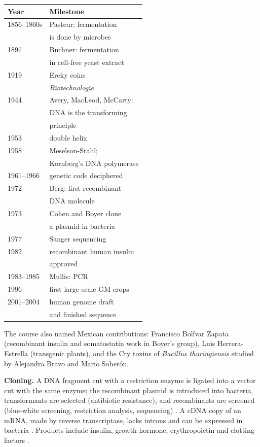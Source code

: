 \begin{center}
\begin{tabular}{ll}
Year & Milestone \\
\hline
1856--1860s & Pasteur: fermentation \\
 & is done by microbes \\
1897 & Buchner: fermentation \\
 & in cell-free yeast extract \\
1919 & Ereky coins \\
 & \emph{Biotechnologie} \\
1944 & Avery, MacLeod, McCarty: \\
 & DNA is the transforming \\
 & principle \\
1953 & double helix \\
1958 & Meselson-Stahl; \\
 & Kornberg's DNA polymerase \\
1961--1966 & genetic code deciphered \\
1972 & Berg: first recombinant \\
 & DNA molecule \\
1973 & Cohen and Boyer clone \\
 & a plasmid in bacteria \\
1977 & Sanger sequencing \\
1982 & recombinant human insulin \\
 & approved \\
1983--1985 & Mullis: PCR \\
1996 & first large-scale GM crops \\
2001--2004 & human genome draft \\
 & and finished sequence \\
\end{tabular}
\end{center}

The course also named Mexican contributions:
Francisco Bolívar Zapata (recombinant insulin
and somatostatin work in Boyer's group), Luis
Herrera-Estrella (transgenic plants), and the
Cry toxins of \emph{Bacillus thuringiensis}
studied by Alejandra Bravo and Mario Soberón.

\textbf{Cloning.}
A DNA fragment cut with a restriction enzyme
is ligated into a vector cut with the same
enzyme; the recombinant plasmid is introduced
into bacteria, transformants are selected
(antibiotic resistance), and recombinants are
screened (blue-white screening, restriction
analysis, sequencing) \cite[Section
3-5]{voet2013fundamentals}. A cDNA copy of an
mRNA, made by reverse transcriptase, lacks
introns and can be expressed in bacteria
\cite[Chapter 10]{alberts2014essential}.
Products include insulin, growth hormone,
erythropoietin and clotting factors
\cite[Section 3-5]{voet2013fundamentals}.

